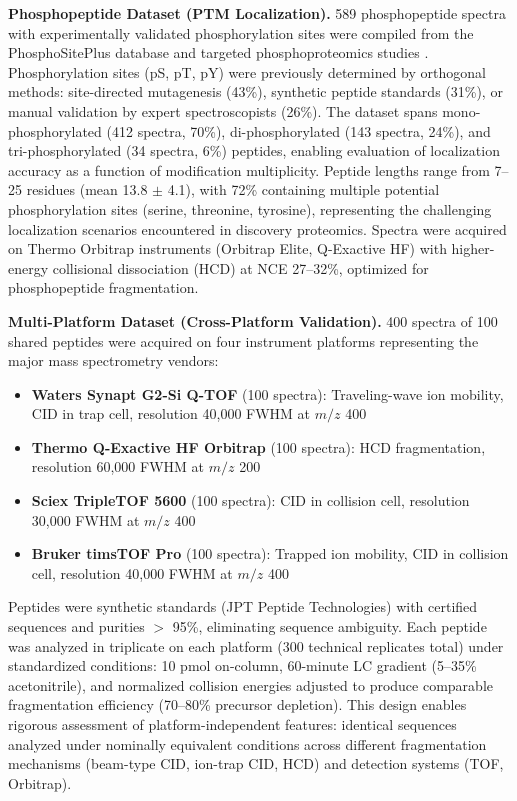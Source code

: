 \documentclass[11pt,twocolumn]{article}
\begin{document}
\textbf{Phosphopeptide Dataset (PTM Localization).} 589 phosphopeptide spectra with experimentally validated phosphorylation sites were compiled from the PhosphoSitePlus database \cite{hornbeck2015phosphositeplus} and targeted phosphoproteomics studies \cite{olsen2006global}. Phosphorylation sites (pS, pT, pY) were previously determined by orthogonal methods: site-directed mutagenesis (43\%), synthetic peptide standards (31\%), or manual validation by expert spectroscopists (26\%). The dataset spans mono-phosphorylated (412 spectra, 70\%), di-phosphorylated (143 spectra, 24\%), and tri-phosphorylated (34 spectra, 6\%) peptides, enabling evaluation of localization accuracy as a function of modification multiplicity. Peptide lengths range from 7--25 residues (mean 13.8 $\pm$ 4.1), with 72\% containing multiple potential phosphorylation sites (serine, threonine, tyrosine), representing the challenging localization scenarios encountered in discovery proteomics. Spectra were acquired on Thermo Orbitrap instruments (Orbitrap Elite, Q-Exactive HF) with higher-energy collisional dissociation (HCD) at NCE 27--32\%, optimized for phosphopeptide fragmentation.

\textbf{Multi-Platform Dataset (Cross-Platform Validation).} 400 spectra of 100 shared peptides were acquired on four instrument platforms representing the major mass spectrometry vendors:
\begin{itemize}[leftmargin=*]
    \item \textbf{Waters Synapt G2-Si Q-TOF} (100 spectra): Traveling-wave ion mobility, CID in trap cell, resolution 40,000 FWHM at $m/z$ 400
    \item \textbf{Thermo Q-Exactive HF Orbitrap} (100 spectra): HCD fragmentation, resolution 60,000 FWHM at $m/z$ 200
    \item \textbf{Sciex TripleTOF 5600} (100 spectra): CID in collision cell, resolution 30,000 FWHM at $m/z$ 400
    \item \textbf{Bruker timsTOF Pro} (100 spectra): Trapped ion mobility, CID in collision cell, resolution 40,000 FWHM at $m/z$ 400
\end{itemize}
Peptides were synthetic standards (JPT Peptide Technologies) with certified sequences and purities $>$ 95\%, eliminating sequence ambiguity. Each peptide was analyzed in triplicate on each platform (300 technical replicates total) under standardized conditions: 10 pmol on-column, 60-minute LC gradient (5--35\% acetonitrile), and normalized collision energies adjusted to produce comparable fragmentation efficiency (70--80\% precursor depletion). This design enables rigorous assessment of platform-independent features: identical sequences analyzed under nominally equivalent conditions across different fragmentation mechanisms (beam-type CID, ion-trap CID, HCD) and detection systems (TOF, Orbitrap).
\end{document}
